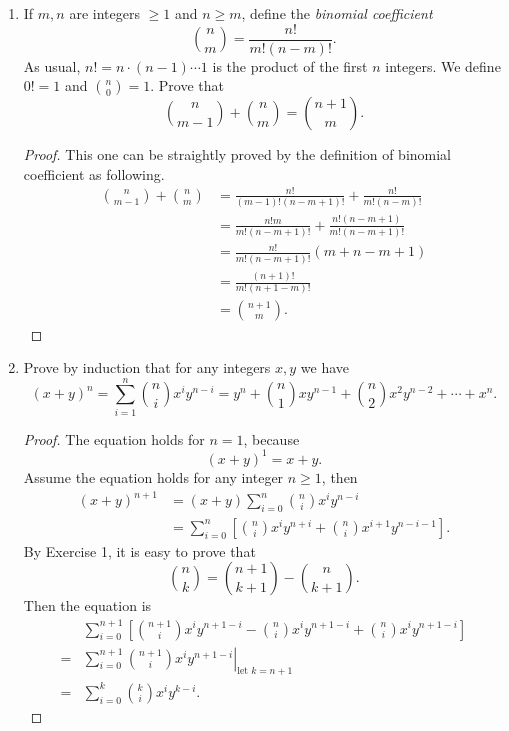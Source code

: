 \begin{enumerate}[1.]
	\item If $m,n$ are integers $\ge 1$ and $n \ge m$, define the \textit{binomial coefficient}
	$$
	{n \choose m} = \frac{n!}{m!(n - m)!}.
	$$
	As usual, $n! = n \cdot (n - 1) \cdots 1$ is the product of the first $n$ integers. We define $0! = 1$ and ${n \choose 0} = 1$. Prove that
	$$
	{n \choose m - 1} + {n \choose m} = {n + 1 \choose m}.
	$$
	\begin{proof}
		This one can be straightly proved by the definition of binomial coefficient as following.
		$$
		\begin{aligned}
			{n \choose m - 1} + {n \choose m} &= \frac{n!}{(m - 1)! (n - m + 1)!} + \frac{n!}{m! (n - m)!} \\
			&= \frac{n! m}{m!(n - m + 1)!} + \frac{n!(n - m + 1)}{m!(n - m + 1)!} \\
			&= \frac{n!}{m!(n - m + 1)!}(m + n - m + 1) \\
			&= \frac{(n + 1)!}{m!(n + 1 - m)!} \\
			&= {n + 1 \choose m}.
		\end{aligned}
		$$
	\end{proof}
	
	
	\item Prove by induction that for any integers $x,y$ we have
	$$
	(x + y)^n = \sum_{i = 1}^n {n \choose i} x^i y^{n-i} = y^n + {n \choose 1}xy^{n-1} + {n \choose 2}x^2 y^{n-2} + \cdots + x^n.
	$$
	\begin{proof}
		The equation holds for $n = 1$, because
		$$
		(x + y)^1 = x + y.
		$$
		Assume the equation holds for any integer $n \ge 1$, then
		$$
		\begin{aligned}
			(x + y)^{n + 1} &= (x + y) \sum_{i = 0}^n {n \choose i}x^iy^{n - i} \\
			& = \sum_{i = 0}^n \left[ {n \choose i} x^iy^{n + i} + {n \choose i} x^{i + 1}y^{n - i - 1} \right].
		\end{aligned}
		$$
		By Exercise 1, it is easy to prove that
		$$
		{n \choose k} = {n + 1 \choose k + 1} - {n \choose k + 1}.
		$$
		Then the equation is
		$$
		\begin{aligned}
			&\sum_{i = 0}^{n + 1} \left[ {n + 1 \choose i} x^i y^{n + 1 - i} - {n \choose i} x^iy^{n + 1 - i} + {n \choose i} x^i y^{n + 1 - i} \right]\\
			=& \left. \sum_{i = 0}^{n + 1}{n + 1 \choose i}x^i y^{n + 1 - i} \right|_{\text{let $k = n + 1$}} \\
			=& \sum_{i = 0}^k {k \choose i} x^i y^{k - i}.
		\end{aligned}
		$$
	\end{proof}
	

\end{enumerate}
